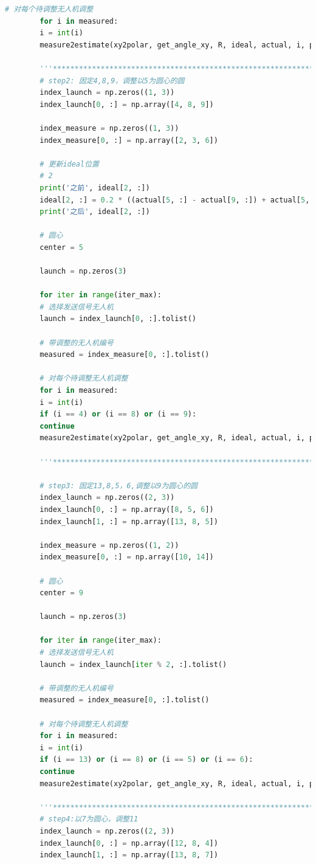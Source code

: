\documentclass[withoutpreface,bwprint]{cumcmthesis} %
\begin{document}
\begin{lstlisting}[language=python]
		# 对每个待调整无人机调整
		for i in measured:
		i = int(i)
		measure2estimate(xy2polar, get_angle_xy, R, ideal, actual, i, position_hat, lr, launch, center)
		
		'''*********************************************************************'''
		# step2: 固定4,8,9，调整以5为圆心的圆
		index_launch = np.zeros((1, 3))
		index_launch[0, :] = np.array([4, 8, 9])
		
		index_measure = np.zeros((1, 3))
		index_measure[0, :] = np.array([2, 3, 6])
		
		# 更新ideal位置
		# 2
		print('之前', ideal[2, :])
		ideal[2, :] = 0.2 * ((actual[5, :] - actual[9, :]) + actual[5, :]) + 0.8 * ideal[2, :]
		print('之后', ideal[2, :])
		
		# 圆心
		center = 5
		
		launch = np.zeros(3)
		
		for iter in range(iter_max):
		# 选择发送信号无人机
		launch = index_launch[0, :].tolist()
		
		# 带调整的无人机编号
		measured = index_measure[0, :].tolist()
		
		# 对每个待调整无人机调整
		for i in measured:
		i = int(i)
		if (i == 4) or (i == 8) or (i == 9):
		continue
		measure2estimate(xy2polar, get_angle_xy, R, ideal, actual, i, position_hat, lr, launch, center)
		
		'''***********************************************************************'''
		
		# step3: 固定13,8,5，6,调整以9为圆心的圆
		index_launch = np.zeros((2, 3))
		index_launch[0, :] = np.array([8, 5, 6])
		index_launch[1, :] = np.array([13, 8, 5])
		
		index_measure = np.zeros((1, 2))
		index_measure[0, :] = np.array([10, 14])
		
		# 圆心
		center = 9
		
		launch = np.zeros(3)
		
		for iter in range(iter_max):
		# 选择发送信号无人机
		launch = index_launch[iter % 2, :].tolist()
		
		# 带调整的无人机编号
		measured = index_measure[0, :].tolist()
		
		# 对每个待调整无人机调整
		for i in measured:
		i = int(i)
		if (i == 13) or (i == 8) or (i == 5) or (i == 6):
		continue
		measure2estimate(xy2polar, get_angle_xy, R, ideal, actual, i, position_hat, lr, launch, center)
		
		'''************************************************************'''
		# step4:以7为圆心，调整11
		index_launch = np.zeros((2, 3))
		index_launch[0, :] = np.array([12, 8, 4])
		index_launch[1, :] = np.array([13, 8, 7])
		

\end{lstlisting}
\end{document}
